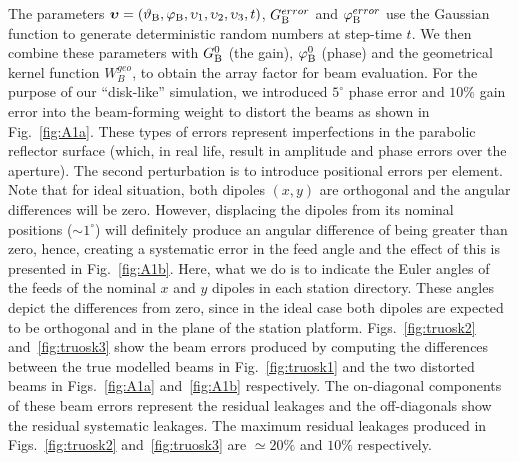 \noindent The parameters  $\boldsymbol{\upsilon} = (\vartheta_{\rm B}, \varphi_{\rm B}, \upsilon_{\rm 1}, \upsilon_{\rm 2}, \upsilon_{\rm 3}, t)$, 
$G_{\rm B}^{error}$ and $\varphi_{\rm B}^{error}$ use the Gaussian function to generate deterministic random numbers at step-time $t$. We then combine these
parameters with $G_{\rm B}^{ 0}$ (the gain), $\varphi_{\rm B}^{0}$ (phase) and the geometrical kernel function $W_{B}^{geo}$, to obtain the array factor for beam evaluation.
For the purpose of our \enquote{disk-like} simulation, we introduced $5^\circ$ 
phase error and $10 \%$ gain error into the beam-forming weight to distort the beams as shown in Fig.~\ref{fig:A1a}. These types of errors represent imperfections 
in the parabolic reflector surface (which, in real life, result in amplitude and phase errors over the aperture).
The second perturbation is to introduce positional errors per element. Note that for ideal situation, both dipoles $(x,y)$ are orthogonal and the angular differences 
will be zero. However, displacing the dipoles from its nominal positions ($\sim 1^\circ$) will definitely produce an angular difference of being greater than zero, hence, creating a
systematic error in the feed angle and the effect of this is presented in  Fig.~\ref{fig:A1b}. Here, what we do is to indicate the Euler angles of the feeds of the nominal $x$ and $y$ dipoles in each station directory. These angles depict the differences from zero, since in the ideal case  both dipoles are expected to be  orthogonal and in the plane of the station platform.
Figs.~\ref{fig:truosk2} and~\ref{fig:truosk3} 
show the beam errors produced by computing the differences between the true modelled beams in Fig.~\ref{fig:truosk1} and the two distorted beams in Figs.~\ref{fig:A1a} 
and~\ref{fig:A1b} respectively. The on-diagonal components of these beam errors represent the residual leakages and the off-diagonals show the residual systematic leakages. 
The maximum residual leakages produced in Figs.~\ref{fig:truosk2} and~\ref{fig:truosk3} are $\simeq 20 \%$ and $10 \%$ respectively.

